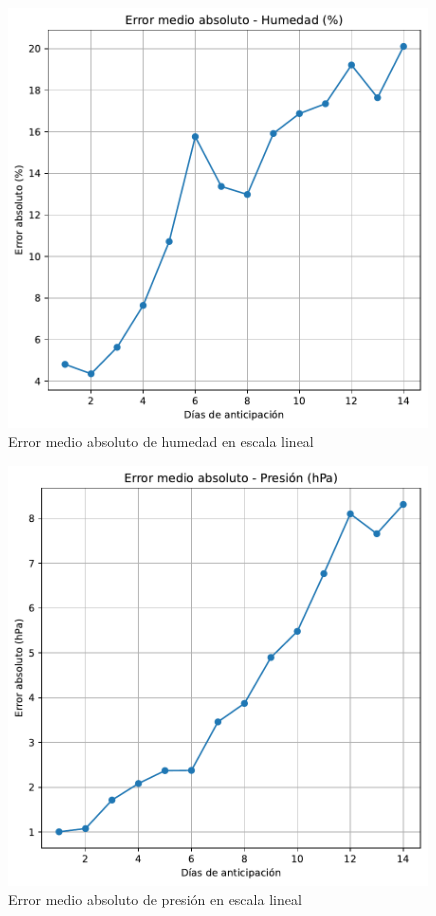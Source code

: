 \documentclass[
  10pt,
  a4paper,
  DIV=11,
  numbers=noendperiod,
  open=any]{scrreprt}
\numberwithin{equation}{chapter}
\numberwithin{equation}{section}
\renewcommand{\[}{\begin{equation}}
\renewcommand{\]}{\end{equation}}
\begin{document}
\begin{figure}[h]
  \centering
  \includegraphics[width=0.99\textwidth]{03-meteorologia/predicciones_files/figure-pdf/cell-3-output-2.pdf}
  \caption{Error medio absoluto de humedad en escala lineal}
\end{figure}

\begin{figure}[h]
  \centering
  \includegraphics[width=0.99\textwidth]{03-meteorologia/predicciones_files/figure-pdf/cell-3-output-3.pdf}
  \caption{Error medio absoluto de presión en escala lineal}
\end{figure}
\end{document}
